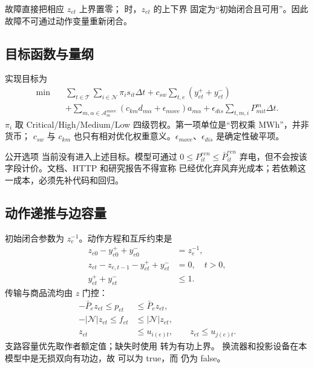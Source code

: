 故障直接把相应 $z_{et}$ 上界置零； 时，$z_{et}$ 的上下界
固定为“初始闭合且可用”。因此故障不可通过动作变量重新闭合。

\subsection{目标函数与量纲}

实现目标为
\begin{align}
\min\quad
 &\sum_{t\in\mathcal T}\sum_{i\in\mathcal N}
       \pi_i s_{it}\Delta t
 +c_{sw}\sum_{t,e}(y^+_{et}+y^-_{et}) \\
 &+\sum_{m,\alpha\in\mathcal A_m^{move}}
       (c_{km}d_{m\alpha}+\epsilon_{move})a_{m\alpha}
 +\epsilon_{dis}\sum_{t,m,i}P^m_{mit}\Delta t .
\end{align}
$\pi_i$ 取 Critical/High/Medium/Low 四级罚权。第一项单位是“罚权乘 MWh”，并非货币；
$c_{sw}$ 与 $c_{km}$ 也只有相对优化权重意义。$\epsilon_{move}$、$\epsilon_{dis}$ 是确定性破平项。

\begin{gapnote}
公开选项  当前没有进入上述目标。模型可通过
$0\le P^{ren}_{it}\le\bar P^{ren}_{it}$ 弃电，但不会按该字段计价。文档、HTTP 和研究报告不得宣称
已经优化弃风弃光成本；若依赖这一成本，必须先补代码和回归。
\end{gapnote}

\subsection{动作递推与边容量}

初始闭合参数为 $z_e^{-1}$。动作方程和互斥约束是
\begin{align}
 z_{e0}-y^+_{e0}+y^-_{e0}&=z_e^{-1},\\
 z_{et}-z_{e,t-1}-y^+_{et}+y^-_{et}&=0,\quad t>0,\\
 y^+_{et}+y^-_{et}&\le1.
\end{align}
传输与商品流均由 $z$ 门控：
\begin{align}
 -\bar P_ez_{et}\le p_{et}&\le\bar P_ez_{et},\\
 -|\mathcal N|z_{et}\le f_{et}&\le|\mathcal N|z_{et},\\
 z_{et}&\le u_{i(e)t},\qquad z_{et}\le u_{j(e)t}.
\end{align}
支路容量优先取作者额定值；缺失时使用  转为有功上界。
换流器和投影设备在本模型中是无损双向有功边，故 
可以为 true，而  仍为 false。

